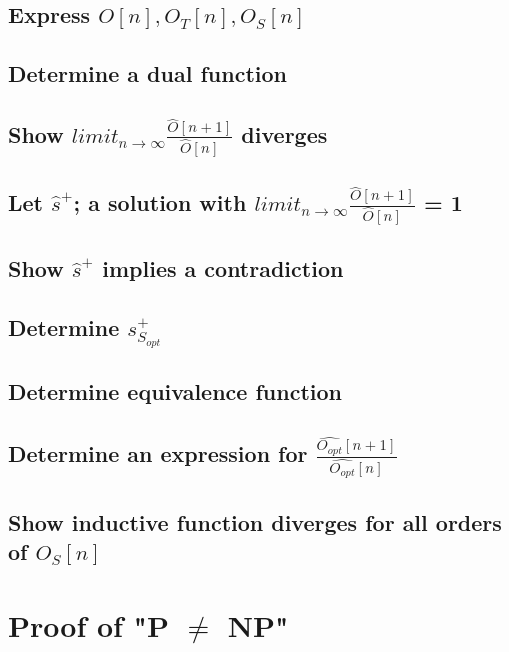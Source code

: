 \documentclass[11pt]{article}
\begin{document}
\subsection{Express $O[n],O_T[n],O_S[n]$}
\subsection{Determine a dual function}
\subsection{Show $limit_{n \rightarrow \infty} \frac{\hat{O}[n+1]}{\hat{O}[n]}$ \hspace{1mm} diverges}
\subsection{Let $\hat{s}^+$; a solution with $limit_{n \rightarrow \infty} \frac{\hat{O}[n+1]}{\hat{O}[n]}$ = 1}
\subsection{Show $\hat{s}^+$ implies a contradiction}


\subsection{Determine $s^+_{S_{opt}}$}
\subsection{Determine equivalence function}
\subsection{Determine an expression for $\frac{\hat{O_{opt}}[n+1]}{\hat{O_{opt}}[n]}$}

\subsection{Show inductive function diverges for all orders of $O_S[n]$}


\newpage
\section{Proof of "P $\neq$ NP"}
\end{document}

